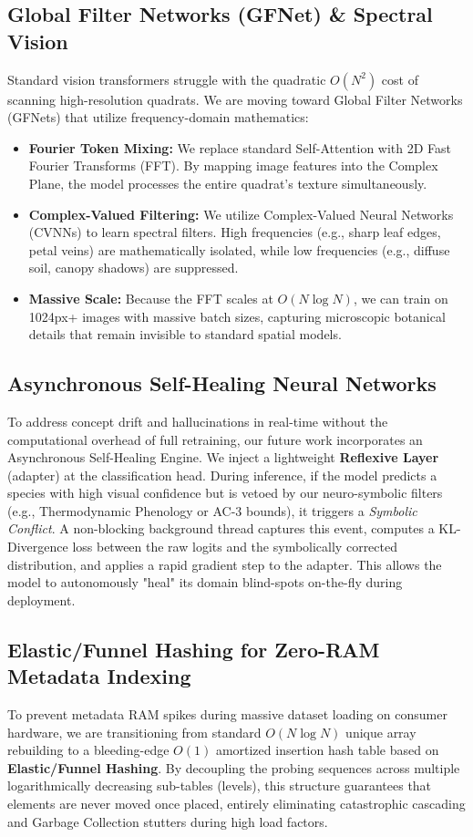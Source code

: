 \documentclass[10pt,twocolumn,letterpaper]{article}
\begin{document}
\subsection{Global Filter Networks (GFNet) \& Spectral Vision}
Standard vision transformers struggle with the quadratic $O(N^2)$ cost of scanning high-resolution quadrats. We are moving toward Global Filter Networks (GFNets) that utilize frequency-domain mathematics:
\begin{itemize}
    \item \textbf{Fourier Token Mixing:} We replace standard Self-Attention with 2D Fast Fourier Transforms (FFT). By mapping image features into the Complex Plane, the model processes the entire quadrat's texture simultaneously.
    \item \textbf{Complex-Valued Filtering:} We utilize Complex-Valued Neural Networks (CVNNs) to learn spectral filters. High frequencies (e.g., sharp leaf edges, petal veins) are mathematically isolated, while low frequencies (e.g., diffuse soil, canopy shadows) are suppressed.
    \item \textbf{Massive Scale:} Because the FFT scales at $O(N \log N)$, we can train on 1024px+ images with massive batch sizes, capturing microscopic botanical details that remain invisible to standard spatial models.
\end{itemize}

\subsection{Asynchronous Self-Healing Neural Networks}
To address concept drift and hallucinations in real-time without the computational overhead of full retraining, our future work incorporates an Asynchronous Self-Healing Engine. We inject a lightweight \textbf{Reflexive Layer} (adapter) at the classification head. During inference, if the model predicts a species with high visual confidence but is vetoed by our neuro-symbolic filters (e.g., Thermodynamic Phenology or AC-3 bounds), it triggers a \textit{Symbolic Conflict}. A non-blocking background thread captures this event, computes a KL-Divergence loss between the raw logits and the symbolically corrected distribution, and applies a rapid gradient step to the adapter. This allows the model to autonomously "heal" its domain blind-spots on-the-fly during deployment.

\subsection{Elastic/Funnel Hashing for Zero-RAM Metadata Indexing}
To prevent metadata RAM spikes during massive dataset loading on consumer hardware, we are transitioning from standard $O(N \log N)$ unique array rebuilding to a bleeding-edge $O(1)$ amortized insertion hash table based on \textbf{Elastic/Funnel Hashing}. By decoupling the probing sequences across multiple logarithmically decreasing sub-tables (levels), this structure guarantees that elements are never moved once placed, entirely eliminating catastrophic cascading and Garbage Collection stutters during high load factors.
\end{document}
